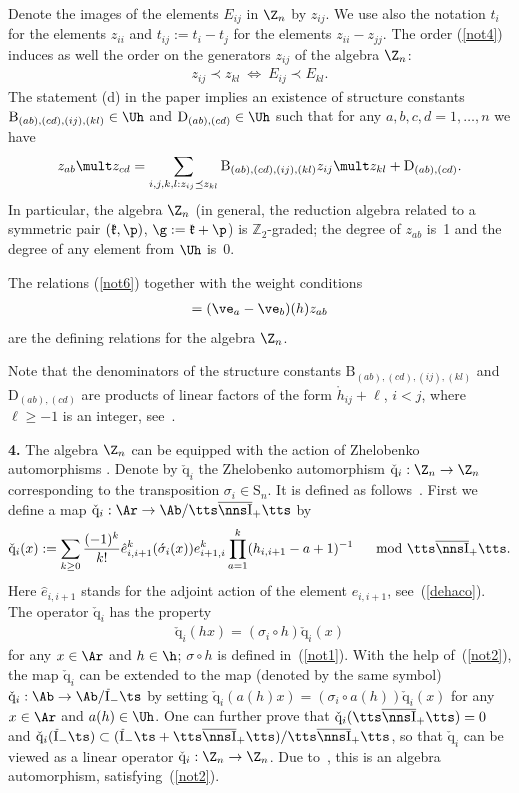 \documentclass[pdftex]{sigma}
\def\Ib{\tts\overline{\nns\rm I}_+\tts}\def\J{\mathrm{J}}\def\Jb{\,\overline{\!\rm I}_-\ts}\def\k{\mathfrak{k}}
\def\nplus{\mathfrak{n}}\def\nn{\nonumber}\def\nin{\noindent}
\def\q{\check{\mathrm q}}\def\Q{\mathrm{Q}}\def\r#1{(\ref{#1})}\let\rf=\r
\def\s{z}\def\S{\mathrm {S}}\def\si{\sigma}\def\Sp{\S^{\nplus}}\def\sy{\acute{\sigma}}\def\th{\mathring{h}}
\newcommand{\ZZ}{{\mathbb Z}}\def\Hom{\operatorname{Hom}}\def\I{\mathrm{I}}
\numberwithin{equation}{section}
\begin{document}
Denote the images of the elements $E_{ij}$ in $\Z_n$ by $\s_{ij}$. We use also the notation $t_i$ for the elements $\s_{ii}$ and $t_{ij}:=t_i-t_j$ for the elements
$\s_{ii}-\s_{jj}$. The order \rf{not4} induces as well the order on the generators $\s_{ij}$ of the algebra $\Z_n$:
\begin{gather*} %
\s_{ij}\prec\s_{kl}\ \Leftrightarrow\ E_{ij}\prec E_{kl}  .
\end{gather*}
The  statement (d) in the paper \cite[Section~2]{KO3} implies an existence of structure constants $\mathrm{B}_{(ab),(cd),(ij),(kl)} \in \Uh$ and $\mathrm{D}_{(ab),(cd)}\in\Uh$
such that for any $a,b,c,d=1,\ldots,n$ we have
\begin{gather}\label{not6}
\s_{ab}\mult\s_{cd}=\sum_{i,j,k,l:\s_{ij}\preceq\s_{kl}}\mathrm{B}_{(ab),(cd),(ij),(kl)}\s_{ij}\mult\s_{kl}+\mathrm{D}_{(ab),(cd)}  .
\end{gather}
In particular, the algebra $\Z_n$ (in general, the reduction algebra related to a symmetric pair $(\k,\p)$, $\g :=\k +\p$) is $\ZZ_2$-graded; the degree of $\s_{ab}$ is~1 and the degree of any element from $\Uh$ is~0.


The relations \rf{not6} together with the weight conditions
\begin{gather*}
 [h,\s_{ab}]=(\ve_a-\ve_b)(h) \s_{ab}%
\end{gather*}
are the def\/ining relations for the algebra $\Z_n$.


Note that the denominators of the structure constants $\mathrm{B}_{(ab),(cd),(ij),(kl)}$ and
 $\mathrm{D}_{(ab),(cd)}$ are pro\-ducts
of linear factors of the form $\th_{ij}+\ell$, $i<j$, where $\ell\geq -1$ is an integer, see~\cite{KO3}.

{\bf 4.} The algebra $\Z_n$ can be equipped with the action of Zhelobenko automorphisms \cite{KO}.  Denote by $\q_{i}$  the Zhelobenko
automorphism $\q_i:\Z_n\to\Z_n$  corresponding to the transposition $\si_i\in\S_n$. It is def\/ined as follows~\cite{KO}. First we def\/ine a map
$\q_i:\Ar\to \Ab/\Ib$ by
\begin{gather} \label{not7}
\q_i(x):=\sum_{k\geq 0}\frac{(-1)^k}{k!} \hat{e}_{i,i+1}^k(\sy_i(x)) e_{i+1,i}^k   \prod_{a=1}^k(h_{i,i+1}-a+1)^{-1}
\quad \mod\Ib  .
\end{gather}
Here $\hat{e}_{i,i+1}$ stands for the adjoint action of the element $e_{i,i+1}$, see~\rf{dehaco}.
The operator $\q_i$ has the property
\begin{gather}
\label{not2}
\q_i(hx)=(\si_i\circ h)\q_i(x)
\end{gather}
for any $x\in\Ar$ and  $h\in\h$; $\si\circ h$ is def\/ined in~\rf{not1}. With the help of~(\ref{not2}), the map $\q_i$ can be extended
to the map (denoted by the same symbol) $\q_i:\Ab\to \Ab/\Jb$ by
setting $\q_i(a(h)x)=(\si_i\circ a(h))\q_i(x)$ for any $x\in\Ar$ and
$a(h)\in\Uh$. One can further prove that $\q_i(\Ib)=0$ and $\q_i(\Jb)\subset (\Jb+\Ib)/\Ib$,
so that $\q_i$ can be viewed as a linear operator $\q_i:\Z_n\to\Z_n$. Due to~\cite{KO},
this is an algebra automorphism, satisfying~\rf{not2}.
\end{document}

